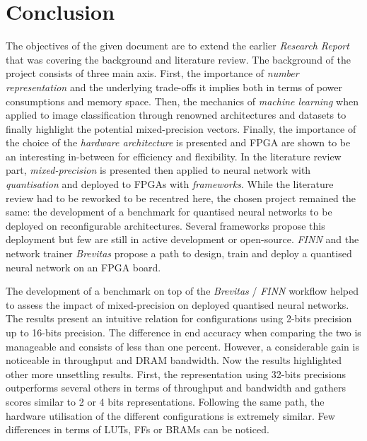 \chapter{Conclusion} %

\label{Chapter9} %


The objectives of the given document are to extend the earlier \emph{Research Report} that was covering the background and literature review. The background of the project consists of three main axis. First, the importance of \emph{number representation} and the underlying trade-offs it implies both in terms of power consumptions and memory space. Then, the mechanics of \emph{machine learning} when applied to image classification through renowned architectures and datasets to finally highlight the potential mixed-precision vectors. Finally, the importance of the choice of the \emph{hardware architecture} is presented and FPGA are shown to be an interesting in-between for efficiency and flexibility. In the literature review part, \emph{mixed-precision} is presented then applied to neural network with \emph{quantisation} and deployed to FPGAs with \emph{frameworks}. While the literature review had to be reworked to be recentred here, the chosen project remained the same: the development of a benchmark for quantised neural networks to be deployed on reconfigurable architectures. Several frameworks propose this deployment but few are still in active development or open-source. \emph{FINN} and the network trainer \emph{Brevitas} propose a path to design, train and deploy a quantised neural network on an FPGA board.

The development of a benchmark on top of the \emph{Brevitas} / \emph{FINN} workflow helped to assess the impact of mixed-precision on deployed quantised neural networks. The results present an intuitive relation for configurations using 2-bits precision up to 16-bits precision. The difference in end accuracy when comparing the two is manageable and consists of less than one percent. However, a considerable gain is noticeable in throughput and DRAM bandwidth. Now the results highlighted other more unsettling results. First, the representation using 32-bits precisions outperforms several others in terms of throughput and bandwidth and gathers scores similar to 2 or 4 bits representations. Following the same path, the hardware utilisation of the different configurations is extremely similar. Few differences in terms of LUTs, FFs or BRAMs can be noticed.

